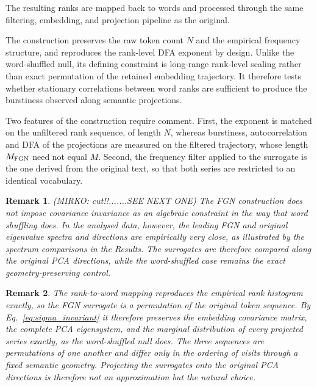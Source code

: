 \documentclass[12pt,a4paper]{article}
\newtheorem{remark}{Remark}
\begin{document}
The resulting ranks are mapped back to words and processed through the
same filtering, embedding, and projection pipeline as the original.

The construction preserves the raw token count $N$ and the empirical
frequency structure, and reproduces the rank-level DFA exponent by
design.
Unlike the word-shuffled null, its defining constraint is long-range
rank-level scaling rather than exact permutation of the retained
embedding trajectory.
It therefore tests whether stationary correlations between word ranks
are sufficient to produce the burstiness observed along semantic
projections.

Two features of the construction require comment.
First, the exponent is matched on the unfiltered rank sequence, of
length $N$, whereas burstiness, autocorrelation and DFA of the
projections are measured on the filtered trajectory, whose length
$M_{\rm FGN}$ need not equal $M$.
Second, the frequency filter applied to the surrogate is the one derived
from the original text, so that both series are restricted to an
identical vocabulary.

\begin{remark}
\label{rem:fgn_cov}
(MIRKO: cut!!.......SEE NEXT ONE)
  The FGN construction does not impose covariance invariance as an
  algebraic constraint in the way that word shuffling does.
  In the analysed data, however, the leading FGN and original
  eigenvalue spectra and directions are empirically very close, as
  illustrated by the spectrum comparisons in the Results.
  The surrogates are therefore compared along the original PCA
  directions, while the word-shuffled case remains the exact
  geometry-preserving control.
\end{remark}

\begin{remark}
\label{rem:fgn_cov}
  The rank-to-word mapping reproduces the empirical rank histogram
  exactly, so the FGN surrogate is a permutation of the original token
  sequence. By Eq.~\eqref{eq:sigma_invariant} it therefore preserves the
  embedding covariance matrix, the complete PCA eigensystem, and the
  marginal distribution of every projected series exactly, as the
  word-shuffled null does. The three sequences are permutations of one
  another and differ only in the ordering of visits through a fixed
  semantic geometry. Projecting the surrogates onto the original PCA
  directions is therefore not an approximation but the natural choice.
\end{remark}
\end{document}
